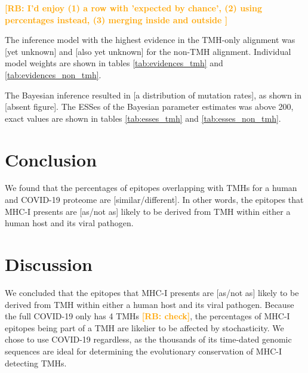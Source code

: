 \documentclass{article}
\newcommand{\richel}[1]{\textcolor{orange}{\textbf{[RB: #1]}}}
\begin{document}
	
	\richel{
	  I'd enjoy 
	  (1) a row with 'expected by chance', 
	  (2) using percentages instead,
	  (3) merging inside and outside
	}

	The inference model with the highest evidence in the
	TMH-only alignment was [yet unknown] and [also yet unknown]
	for the non-TMH alignment. Individual model weights are shown
	in tables \ref{tab:evidences_tmh} 
	and \ref{tab:evidences_non_tmh}.

	The Bayesian inference resulted in [a distribution of mutation rates],
	as shown in [absent figure].
	The ESSes of the Bayesian parameter estimates was above 200, exact values
	are shown in tables \ref{tab:esses_tmh} and \ref{tab:esses_non_tmh}.
\fi

\section{Conclusion}

We found that the percentages of epitopes overlapping 
with TMHs for a human and COVID-19 proteome are 
[similar/different]. In other words, the
epitopes that MHC-I presents are [as/not as] likely 
to be derived from TMH within either a human host and its viral pathogen.

\section{Discussion}

We concluded that the
epitopes that MHC-I presents are [as/not as] likely 
to be derived from TMH within either a human host and its viral pathogen.
Because the full COVID-19 only has 4 TMHs \richel{check}, the percentages
of MHC-I epitopes being part of a TMH are likelier to be affected by
stochasticity. We chose to use COVID-19 regardless, as the thousands
of its time-dated genomic sequences are ideal for determining the 
evolutionary conservation of MHC-I detecting TMHs. 
\end{document}
